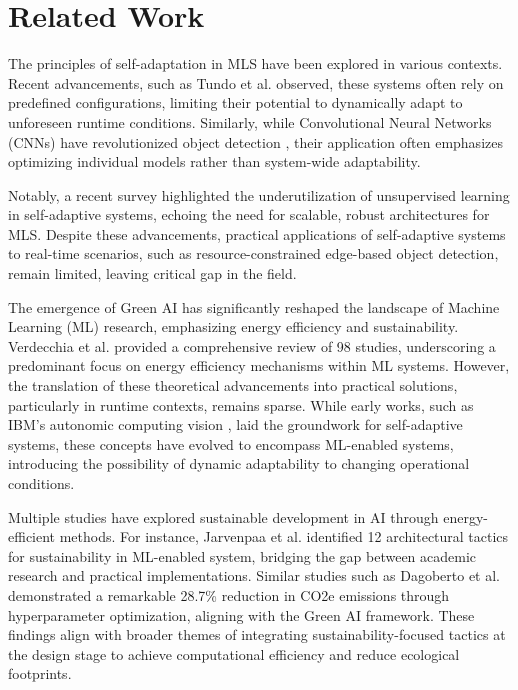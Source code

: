 \section{Related Work}

The principles of self-adaptation in MLS have been explored in various contexts. Recent advancements, such as Tundo et al. \cite{b28} observed, these systems often rely on predefined configurations, limiting their potential to dynamically adapt to unforeseen runtime conditions. Similarly, while Convolutional Neural Networks (CNNs) have revolutionized object detection \cite{b29}, their application often emphasizes optimizing individual models \cite{b30, b31, b32, b33, b34} rather than system-wide adaptability. 

Notably, a recent survey \cite{b22} highlighted the underutilization of unsupervised learning in self-adaptive systems, echoing the need for scalable, robust architectures for MLS. Despite these advancements, practical applications of self-adaptive systems to real-time scenarios, such as resource-constrained edge-based object detection, remain limited, leaving critical gap in the field. 

The emergence of Green AI has significantly reshaped the landscape of Machine Learning (ML) research, emphasizing energy efficiency and sustainability. Verdecchia et al. \cite{b25} provided a comprehensive review of 98 studies, underscoring a predominant focus on energy efficiency mechanisms within ML systems. However, the translation of these theoretical advancements into practical solutions, particularly in runtime contexts, remains sparse. While early works, such as IBM's autonomic computing vision \cite{b26}, laid the groundwork for self-adaptive systems, these concepts have evolved to encompass ML-enabled systems, introducing the possibility of dynamic adaptability to changing operational conditions.

Multiple studies have explored sustainable development in AI through energy-efficient methods. For instance, Jarvenpaa et al. \cite{b27} identified 12 architectural tactics for sustainability in ML-enabled system, bridging the gap between academic research and practical implementations. Similar studies such as Dagoberto et al. \cite{b11} demonstrated a remarkable 28.7\% reduction in CO2e emissions through hyperparameter optimization, aligning with the Green AI framework. These findings align with broader themes of integrating sustainability-focused tactics at the design stage to achieve computational efficiency and reduce ecological footprints. 

